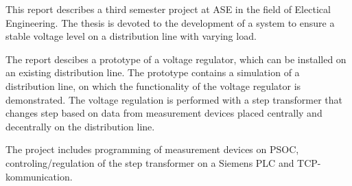 
This report describes a third semester project at ASE in the field of Electical Engineering. The thesis is devoted to the development of a system to ensure a stable voltage level on a distribution line with varying load.

The report descibes a prototype of a voltage regulator, which can be installed on an existing distribution line. The prototype contains a simulation of a distribution line, on which the functionality of the voltage regulator is demonstrated. The voltage regulation is performed with a step transformer that changes step based on data from measurement devices placed centrally and decentrally on the distribution line. 

The project includes programming of measurement devices on PSOC, controling/regulation of the step transformer on a Siemens PLC and TCP-kommunication.

